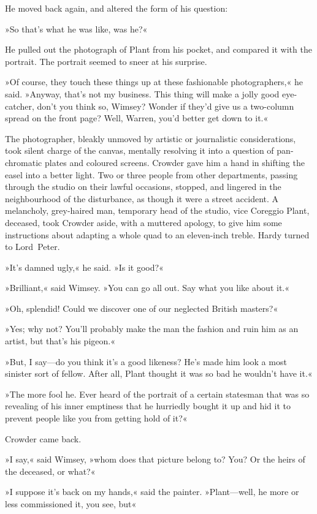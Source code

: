 He moved back again, and altered the form of his question:

»So that's what he was like, was he?«

He pulled out the photograph of Plant from his pocket, and compared it with the portrait. The portrait seemed to sneer at his surprise.

»Of course, they touch these things up at these fashionable photographers,« he said. »Anyway, that's not my business. This thing will make a jolly good eye-catcher, don't you think so, Wimsey? Wonder if they'd give us a two-column spread on the front page? Well, Warren, you'd better get down to it.«

The photographer, bleakly unmoved by artistic or journalistic considerations, took silent charge of the canvas, mentally resolving it into a question of pan-chromatic plates and coloured screens. Crowder gave him a hand in shifting the easel into a better light. Two or three people from other departments, passing through the studio on their lawful occasions, stopped, and lingered in the neighbourhood of the disturbance, as though it were a street accident. A melancholy, grey-haired man, temporary head of the studio, vice Coreggio Plant, deceased, took Crowder aside, with a muttered apology, to give him some instructions about adapting a whole quad to an eleven-inch treble. Hardy turned to Lord~Peter.

»It's damned ugly,« he said. »Is it good?«

»Brilliant,« said Wimsey. »You can go all out. Say what you like about it.«

»Oh, splendid! Could we discover one of our neglected British masters?«

»Yes; why not? You'll probably make the man the fashion and ruin him as an artist, but that's his pigeon.«

»But, I say—do you think it's a good likeness? He's made him look a most sinister sort of fellow. After all, Plant thought it was so bad he wouldn't have it.«

»The more fool he. Ever heard of the portrait of a certain statesman that was so revealing of his inner emptiness that he hurriedly bought it up and hid it to prevent people like you from getting hold of it?«

Crowder came back.

»I say,« said Wimsey, »whom does that picture belong to? You? Or the heirs of the deceased, or what?«

»I suppose it's back on my hands,« said the painter. »Plant—well, he more or less commissioned it, you see, but\longdash«

